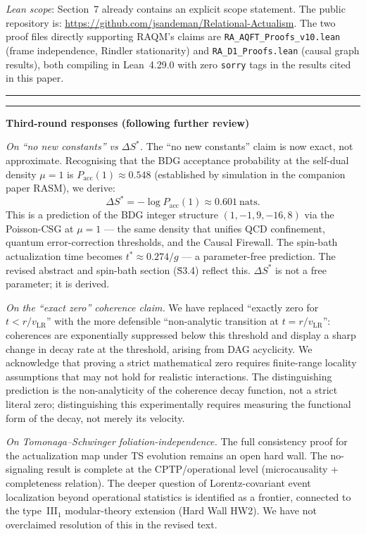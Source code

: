 \documentclass[11pt]{article}
\begin{document}
\emph{Lean scope}: Section~7 already contains an explicit scope statement.
The public repository is:
\url{https://github.com/jsandeman/Relational-Actualism}. The two proof files
directly supporting RAQM's claims are
\texttt{RA\_AQFT\_Proofs\_v10.lean} (frame independence, Rindler stationarity)
and \texttt{RA\_D1\_Proofs.lean} (causal graph results), both compiling in
Lean~4.29.0 with zero \texttt{sorry} tags in the results cited in this paper.

\bigskip\hrule\bigskip


\bigskip\hrule\bigskip

\noindent\textbf{Third-round responses (following further review)}

\smallskip\noindent\textit{On ``no new constants'' vs $\Delta S^*$.}
The ``no new constants'' claim is now exact, not approximate.
Recognising that the BDG acceptance probability at the self-dual density
$\mu = 1$ is $P_{\mathrm{acc}}(1) \approx 0.548$ (established by simulation
in the companion paper RASM), we derive:
\[
  \Delta S^* = -\log P_{\mathrm{acc}}(1) \approx 0.601~\text{nats}.
\]
This is a prediction of the BDG integer structure $(1,-1,9,-16,8)$ via the
Poisson-CSG at $\mu = 1$ --- the same density that unifies QCD
confinement, quantum error-correction thresholds, and the Causal Firewall.
The spin-bath actualization time becomes $t^* \approx 0.274/g$
--- a parameter-free prediction. The revised abstract and spin-bath section
(\.S3.4) reflect this. $\Delta S^*$ is not a free parameter;
it is derived.

\smallskip\noindent\textit{On the ``exact zero'' coherence claim.}
We have replaced ``exactly zero for $t < r/v_{\mathrm{LR}}$'' with the
more defensible ``non-analytic transition at $t = r/v_{\mathrm{LR}}$'':
coherences are exponentially suppressed below this threshold and display
a sharp change in decay rate at the threshold, arising from DAG acyclicity.
We acknowledge that proving a strict mathematical zero requires finite-range
locality assumptions that may not hold for realistic interactions.
The distinguishing prediction is the non-analyticity of the coherence
decay function, not a strict literal zero; distinguishing this experimentally
requires measuring the functional form of the decay, not merely its velocity.

\smallskip\noindent\textit{On Tomonaga--Schwinger foliation-independence.}
The full consistency proof for the actualization map under TS evolution
remains an open hard wall. The no-signaling result is complete at the
CPTP/operational level (microcausality + completeness relation). The
deeper question of Lorentz-covariant event localization beyond operational
statistics is identified as a frontier, connected to the type~III$_1$
modular-theory extension (Hard Wall HW2). We have not overclaimed resolution
of this in the revised text.
\end{document}
